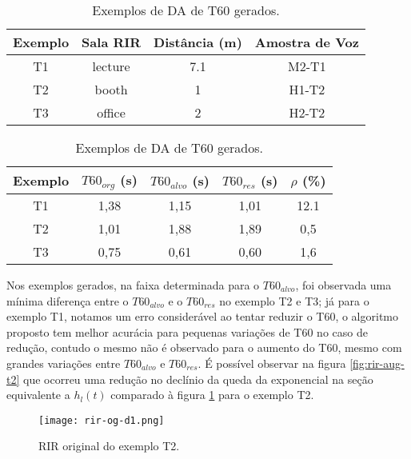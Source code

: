 \begin{table} [H]
    \centering
    \caption{Exemplos de DA de T60 gerados.}
    \label{tbl:da-t60}
    \begin{tabular}{c|c|c|c}

        \textbf{Exemplo} & 
        \textbf{Sala RIR} & 
        \textbf{Distância (m)} &
        \textbf{Amostra de Voz} \\
        \hline 

        T1 & lecture & 7.1 & M2-T1 \\
        T2 & booth & 1 & H1-T2 \\
        T3 & office & 2 & H2-T2 \\

    \end{tabular}
    \bigbreak
    \bigbreak
    \begin{tabular}{c|c|c|c|c}

        \textbf{Exemplo} & 
        \textbf{$T60_{org}$ (s)} & 
        \textbf{$T60_{alvo}$ (s)} &
        \textbf{$T60_{res}$ (s)} & 
        \textbf{$\rho$ (\%)} \\
        \hline 

        T1 & 1,38 & 1,15 & 1,01 & 12.1 \\
        T2 & 1,01 & 1,88 & 1,89 & 0,5 \\
        T3 & 0,75 & 0,61 & 0,60 & 1,6 \\

    \end{tabular}
\end{table}

Nos exemplos gerados, na faixa determinada para o $T60_{alvo}$, foi observada uma mínima diferença entre o $T60_{alvo}$ e o $T60_{res}$ no exemplo T2 e T3;
já para o exemplo T1, notamos um erro considerável ao tentar reduzir o T60, o algoritmo proposto tem melhor acurácia para pequenas variações de T60 no caso de
redução, contudo o mesmo não é observado para o aumento do T60, mesmo com grandes variações entre $T60_{alvo}$ e $T60_{res}$.
É possível observar na figura \ref{fig:rir-aug-t2} que ocorreu uma redução no declínio da queda da exponencial na seção equivalente a $h_l(t)$
comparado à figura \ref{fig:rir-og-t2} para o exemplo T2.

\begin{figure} [H]
    \centering
    \texttt{[image: rir-og-d1.png]}
    \caption{RIR original do exemplo T2.}
    \label{fig:rir-og-t2}
\end{figure} 

